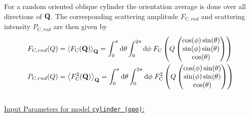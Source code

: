 For a random oriented oblique cylinder the orientation average is done over all directions of $\B{Q}$. The corresponding scattering amplitude $F_{\mathrm{C},rnd}$ and scattering intensity $P_{\mathrm{C},rnd}$ are then given by
\begin{align}
F_{\mathrm{C},rnd}(Q) &= \left\langle F_\mathrm{C}(\B{Q})\right\rangle_\B{Q} = \int_0^\pi\mathrm{d}\theta \int_0^{2\pi}\mathrm{d}\phi \; F_\mathrm{C}\left(Q\begin{pmatrix}
                                       \cos(\phi)\sin(\theta) \\
                                       \sin(\phi)\sin(\theta) \\
                                       \cos(\theta)
                                     \end{pmatrix}\right) \\
P_{\mathrm{C},rnd}(Q) &= \left\langle F_\mathrm{C}^2(\B{Q})\right\rangle_\B{Q} = \int_0^\pi\mathrm{d}\theta \int_0^{2\pi}\mathrm{d}\phi \; F_\mathrm{C}^2\left(Q\begin{pmatrix}
                                       \cos(\phi)\sin(\theta) \\
                                       \sin(\phi)\sin(\theta) \\
                                       \cos(\theta)
                                     \end{pmatrix}\right)
\end{align}
~\\
\underline{Input Parameters for model \texttt{cylinder (opo)}:}
